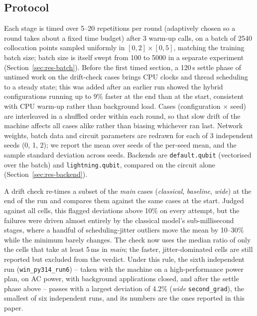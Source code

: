 \subsection{Protocol}
Each stage is timed over 5--20 repetitions per round (adaptively chosen so a round takes about a fixed time
budget) after 3 warm-up calls, on a batch of 2540 collocation points sampled uniformly in $[0,2]\times[0,5]$,
matching the training batch size; batch size is itself swept from 100 to 5000 in a separate experiment
(Section~\ref{sec:res-batch}). Before the first timed section, a 120\,s settle phase of untimed work on
the drift-check cases brings CPU clocks and thread scheduling to a steady state; this was added after an
earlier run showed the hybrid configurations running up to 9\% faster at the end than at the start, consistent
with CPU warm-up rather than background load. Cases (configuration $\times$ seed) are interleaved in a shuffled
order within each round, so that slow drift of the machine affects all cases alike rather than biasing whichever
ran last. Network weights, batch data and circuit parameters are redrawn for each of 3 independent seeds
(0, 1, 2); we report the mean over seeds of the per-seed mean, and the sample standard deviation across seeds.
Backends are \texttt{default.qubit} (vectorised over the batch) and \texttt{lightning.qubit}, compared on the
circuit alone (Section~\ref{sec:res-backend}).

A drift check re-times a subset of the \emph{main} cases (\emph{classical}, \emph{baseline}, \emph{wide}) at the
end of the run and compares them against the same cases at the start. Judged against all cells, this flagged
deviations above 10\% on every attempt, but the failures were driven almost entirely by the classical model's
sub-millisecond stages, where a handful of scheduling-jitter outliers move the mean by 10--30\% while the
minimum barely changes. The check now uses the median ratio of only the cells that take at least 5\,ms in
\emph{main}; the faster, jitter-dominated cells are still reported but excluded from the verdict. Under this
rule, the sixth independent run (\texttt{win\_py314\_run6}) -- taken with the machine on a high-performance
power plan, on AC power, with background applications closed, and after the settle phase above -- passes with
a largest deviation of 4.2\% (\emph{wide} \texttt{second\_grad}), the smallest of six independent runs, and its
numbers are the ones reported in this paper.
